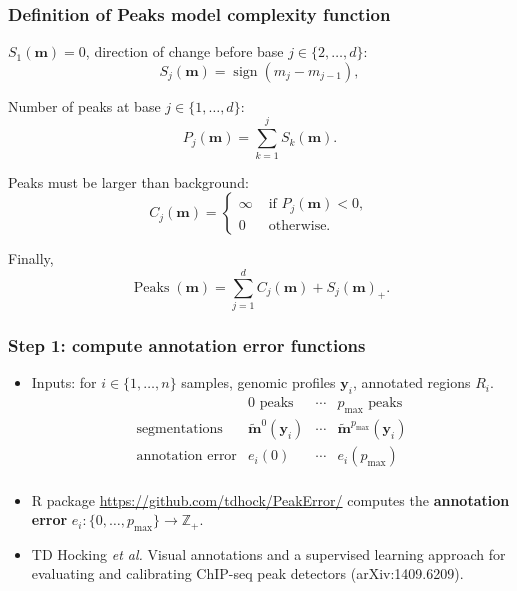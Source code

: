 \documentclass{beamer}
\DeclareMathOperator*{\Peaks}{Peaks}
\newcommand{\sign}{\operatorname{sign}}
\newcommand{\ZZ}{\mathbb Z}
\begin{document}
\begin{frame}
  \frametitle{Definition of Peaks model complexity function}
  $S_1(\mathbf m)=0$, direction of change before base $j\in\{2, \dots, d\}$:
  \begin{equation*}
    \label{eq:S_j}
    S_j(\mathbf m) = \sign( m_{j} - m_{j-1} ),
  \end{equation*}

  Number of peaks at base $j\in\{1, \dots, d\}$:
  \begin{equation*}
    \label{eq:P_j}
    P_j(\mathbf m) = \sum_{k=1}^j S_k(\mathbf m).
  \end{equation*}

  Peaks must be larger than background:
  \begin{equation*}
    \label{eq:C_j}
    C_j(\mathbf m) =
    \begin{cases}
      \infty & \text{ if } P_j(\mathbf m) < 0,\\
      0 & \text{ otherwise.}
    \end{cases}
  \end{equation*}
  
  Finally,
  \begin{equation*}
    \label{eq:Peaks}
    \Peaks(\mathbf m) =
    \sum_{j=1}^d 
    C_j(\mathbf m) +
    S_j(\mathbf m)_+.
  \end{equation*}
  
\end{frame}


\begin{frame}
  \frametitle{Step 1: compute annotation error functions}
  \begin{itemize}
  \item Inputs: for $i\in\{1, \dots, n\}$ samples, genomic profiles
    $\mathbf y_i$, annotated regions $R_i$.
    \begin{equation*}
      \begin{array}{cccc}
        & \text{0 peaks} & \cdots & \text{$p_{\text{max}}$ peaks}\\
        \hline
        \text{segmentations} &
        \mathbf{\tilde m}^0(\mathbf y_i) & 
        \cdots & 
        \mathbf{\tilde m}^{p_{\text{max}}}(\mathbf y_i)\\
        \text{annotation error} & 
        e_i(0) &
        \cdots & 
        e_i(p_{\text{max}})\\
      \end{array}
    \end{equation*}
  \item R package \url{https://github.com/tdhock/PeakError/} computes
    the \textbf{annotation error}
    $e_i:\{0,\dots,p_{\text{max}}\}\rightarrow \ZZ_+$.
  \item   TD Hocking \emph{et al.} Visual annotations and a supervised
    learning approach for evaluating and calibrating ChIP-seq peak detectors
    (arXiv:1409.6209).
  \end{itemize}
\end{frame}
\end{document}
